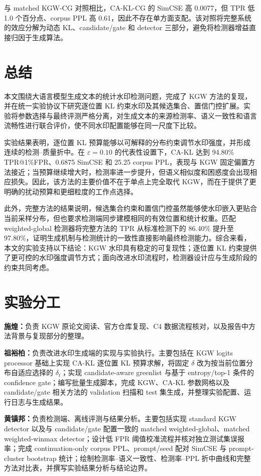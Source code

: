 \documentclass[a4paper,UTF8,zihao=5]{ctexart}
\makeatletter
\newcommand{\cakl}{CA-KL}
\newcommand{\caklcg}{CA-KL-CG}
\newcommand{\tpr}{TPR@1\%FPR}
\makeatother
\begin{document}
与 matched KGW-CG 对照相比，\caklcg{} 的 SimCSE 高 0.0077，但 TPR 低 1.0 个百分点、corpus PPL 高 0.61，因此不存在单方面支配。该对照将完整系统的效应分解为动态 KL、candidate/gate 和 detector 三部分，避免将检测器增益直接归因于生成算法。

\section{总结}

本文围绕大语言模型生成文本的统计水印检测问题，完成了 KGW 方法的复现，并在统一实验协议下研究逐位置 KL 约束水印及其候选集合、置信门控扩展。实验将参数选择与最终评测严格分离，对生成文本的来源检测率、语义一致性和语言流畅性进行联合评价，使不同水印配置能够在同一尺度下比较。

实验结果表明，逐位置 KL 预算能够以可解释的分布约束调节水印强度，并形成连续的检测--质量折中。在 $\varepsilon=0.10$ 的代表性设置下，\cakl{} 达到 94.80\% \tpr{}、0.6875 SimCSE 和 25.25 corpus PPL，表现与 KGW 固定偏置方法接近；当预算继续增大时，检测率进一步提升，但语义相似度和困惑度会出现相应损失。因此，该方法的主要价值不在于单点上完全取代 KGW，而在于提供了更明确的扰动预算和更细粒度的工作点选择。

此外，完整方法的结果说明，候选集合约束和置信门控虽然能够使水印嵌入更贴合当前采样分布，但也要求检测端同步建模相同的有效位置和统计权重。匹配 weighted-global 检测器将完整方法的 TPR 从标准检测下的 86.40\% 提升至 97.80\%，证明生成机制与检测统计的一致性直接影响最终检测能力。综合来看，本文的实验支持以下结论：KGW 水印具有稳定的可复现性；逐位置 KL 约束提供了更可控的水印强度调节方式；面向改进水印流程时，检测器设计应与生成阶段的约束共同考虑。

\section{实验分工}

\noindent\textbf{施煌：}负责 KGW 原论文阅读、官方仓库复现、C4 数据流程核对，以及报告中方法背景与复现部分的整理。

\noindent\textbf{祖裕柏：}负责改进水印生成端的实现与实验执行。主要包括在 KGW logits processor 基础上实现 \cakl{} 逐位置 KL 预算求解，将固定 $\delta$ 改为按当前位置分布自适应选择的 $\delta_t$；实现 candidate-aware greenlist 与基于 entropy/top-1 条件的 confidence gate；编写批量生成脚本，完成 KGW、\cakl{} 参数网格以及 candidate/gate 相关方法的 validation 扫描和 test 集生成，并整理实验配置、运行日志与生成结果。

\noindent\textbf{黄镇邦：}负责检测端、离线评测与结果分析。主要包括实现 standard KGW detector 以及与 candidate/gate 配置一致的 matched weighted-global、matched weighted-winmax detector；设计低 FPR 阈值校准流程并核对独立测试集误报率；完成 continuation-only corpus PPL、prompt/seed 配对 SimCSE 与 prompt-cluster bootstrap 统计；绘制检测率--语义一致性、检测率--PPL 折中曲线和完整方法对比表，并撰写实验结果分析与结论边界。

\clearpage


\end{document}
